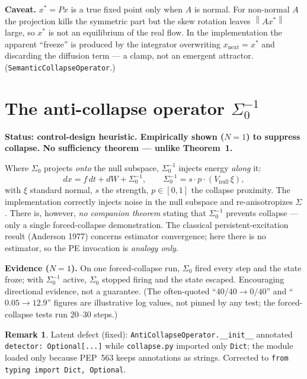 \documentclass[11pt]{article}
\theoremstyle{definition}
\newtheorem{remark}{Remark}
\newcommand{\norm}[1]{\left\lVert#1\right\rVert}
\newcommand{\Szero}{\Sigma_0}
\begin{document}
\begin{caveatbox}
\textbf{Caveat.} $x^\ast=Px$ is a true fixed point only when $A$ is normal. For
non-normal $A$ the projection kills the symmetric part but the skew rotation leaves
$\norm{A x^\ast}$ large, so $x^\ast$ is not an equilibrium of the real flow. In the
implementation the apparent ``freeze'' is produced by the integrator overwriting
$x_{\text{next}}=x^\ast$ and discarding the diffusion term --- a clamp, not an
emergent attractor. (\texttt{SemanticCollapseOperator}.)
\end{caveatbox}

\section{The anti-collapse operator $\Sigma_0^{-1}$}
\begin{caveatbox}
\textbf{Status: control-design heuristic. Empirically shown ($N{=}1$) to suppress
collapse. No sufficiency theorem --- unlike Theorem~1.}
\end{caveatbox}
Where $\Szero$ projects \emph{onto} the null subspace, $\Sigma_0^{-1}$ injects
energy \emph{along} it:
\begin{equation}
dx = f\,dt + dW + \Sigma_0^{-1}, \qquad
\Sigma_0^{-1} = s\cdot p \cdot (V_{\mathrm{null}}\,\xi),
\end{equation}
with $\xi$ standard normal, $s$ the strength, $p\in[0,1]$ the collapse proximity.
The implementation correctly injects noise in the null subspace and
re-anisotropizes $\Sigma$. There is, however, \emph{no companion theorem} stating
that $\Sigma_0^{-1}$ prevents collapse --- only a single forced-collapse
demonstration. The classical persistent-excitation result (Anderson 1977) concerns
estimator convergence; here there is no estimator, so the PE invocation is
\emph{analogy only}.

\begin{verifybox}
\textbf{Evidence ($N{=}1$).} On one forced-collapse run, $\Szero$ fired every step
and the state froze; with $\Sigma_0^{-1}$ active, $\Szero$ stopped firing and the
state escaped. Encouraging directional evidence, not a guarantee. (The often-quoted
``$40/40\to0/40$'' and ``$0.05\to12.9$'' figures are illustrative log values, not
pinned by any test; the forced-collapse tests run $20$--$30$ steps.)
\end{verifybox}

\begin{remark}
Latent defect (fixed): \texttt{AntiCollapseOperator.\_\_init\_\_} annotated
\texttt{detector: Optional[...]} while \texttt{collapse.py} imported only
\texttt{Dict}; the module loaded only because PEP~563 keeps annotations as strings.
Corrected to \texttt{from typing import Dict, Optional}.
\end{remark}
\end{document}
